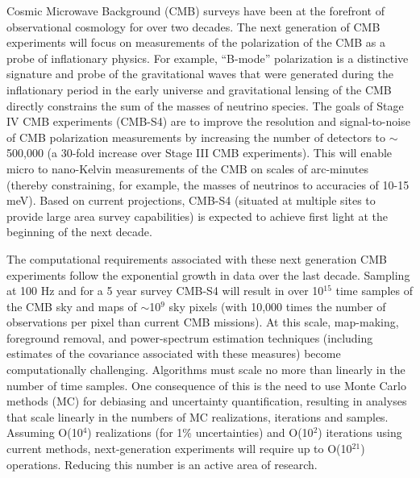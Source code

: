 Cosmic Microwave Background (CMB) surveys have been at the forefront
of observational cosmology for over two decades. The next generation
of CMB experiments will focus on measurements of the polarization of
the CMB as a probe of inflationary physics. For example, ``B-mode''
polarization is a distinctive signature and probe of the gravitational
waves that were generated during the inflationary period in the early
universe and gravitational lensing of the CMB directly constrains the
sum of the masses of neutrino species. The goals of Stage IV CMB
experiments (CMB-S4) are to improve the resolution and
signal-to-noise of CMB polarization measurements by increasing the
number of detectors to $\sim$500,000 (a 30-fold increase over Stage
III CMB experiments). This will enable micro to nano-Kelvin
measurements of the CMB on scales of arc-minutes (thereby
constraining, for example, the masses of neutrinos to accuracies of
10-15 meV). Based on current projections, CMB-S4 (situated at multiple
sites to provide large area survey capabilities) is expected to
achieve first light at the beginning of the next decade.

The computational requirements associated with these next generation
CMB experiments follow the exponential growth in data over the last
decade.  Sampling at 100 Hz and for a 5 year survey CMB-S4 will result
in over 10$^{15}$ time samples of the CMB sky and maps of
$\sim$10$^{9}$ sky pixels (with 10,000 times the number of
observations per pixel than current CMB missions). At this scale,
map-making, foreground removal, and power-spectrum estimation
techniques (including estimates of the covariance associated with
these measures) become computationally challenging. Algorithms must
scale no more than linearly in the number of time samples. One
consequence of this is the need to use Monte Carlo methods (MC) for
debiasing and uncertainty quantification, resulting in analyses that
scale linearly in the numbers of MC realizations, iterations and
samples. Assuming O(10$^4$) realizations (for 1\% uncertainties) and
O(10$^2$) iterations using current methods, next-generation
experiments will require up to O(10$^{21}$) operations. Reducing this
number is an active area of research.

\medskip


